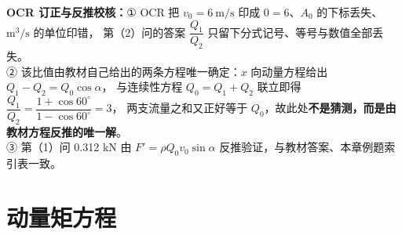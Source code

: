 \begin{tishi}
\textbf{OCR 订正与反推校核：}① OCR 把 $v_0=6\ \mathrm{m/s}$ 印成 $0=6$、$A_0$ 的下标丢失、$\mathrm{m^3/s}$ 的单位印错，
第（2）问的答案 $\dfrac{Q_1}{Q_2}$ 只留下分式记号、等号与数值全部丢失。\\
② 该比值由教材自己给出的两条方程唯一确定：$x$ 向动量方程给出 $Q_1-Q_2=Q_0\cos\alpha$，
与连续性方程 $Q_0=Q_1+Q_2$ 联立即得 $\dfrac{Q_1}{Q_2}=\dfrac{1+\cos60^{\circ}}{1-\cos60^{\circ}}=3$，
两支流量之和又正好等于 $Q_0$，故此处\textbf{不是猜测，而是由教材方程反推的唯一解}。\\
③ 第（1）问 0.312 kN 由 $F'=\rho Q_0v_0\sin\alpha$ 反推验证，与教材答案、本章例题索引表一致。
\end{tishi}

\section{动量矩方程}

